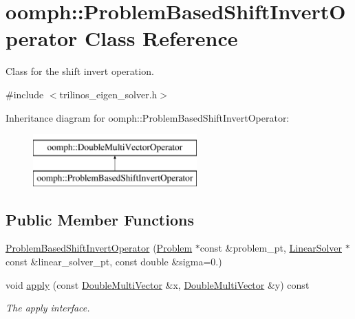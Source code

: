 \hypertarget{classoomph_1_1ProblemBasedShiftInvertOperator}{}\section{oomph\+:\+:Problem\+Based\+Shift\+Invert\+Operator Class Reference}
\label{classoomph_1_1ProblemBasedShiftInvertOperator}


Class for the shift invert operation.  




{\ttfamily \#include $<$trilinos\+\_\+eigen\+\_\+solver.\+h$>$}

Inheritance diagram for oomph\+:\+:Problem\+Based\+Shift\+Invert\+Operator\+:\begin{figure}[H]
\begin{center}
\leavevmode
\includegraphics[height=2.000000cm]{classoomph_1_1ProblemBasedShiftInvertOperator}
\end{center}
\end{figure}
\subsection*{Public Member Functions}
\begin{DoxyCompactItemize}
\item 
\hyperlink{classoomph_1_1ProblemBasedShiftInvertOperator_a2a25d70c81543acf3c97ae7fbe32648e}{Problem\+Based\+Shift\+Invert\+Operator} (\hyperlink{classoomph_1_1Problem}{Problem} $\ast$const \&problem\+\_\+pt, \hyperlink{classoomph_1_1LinearSolver}{Linear\+Solver} $\ast$const \&linear\+\_\+solver\+\_\+pt, const double \&sigma=0.)
\item 
void \hyperlink{classoomph_1_1ProblemBasedShiftInvertOperator_a1f209382d6023466da7e978ce16f1c09}{apply} (const \hyperlink{classoomph_1_1DoubleMultiVector}{Double\+Multi\+Vector} \&x, \hyperlink{classoomph_1_1DoubleMultiVector}{Double\+Multi\+Vector} \&y) const
\begin{DoxyCompactList}\small\item\em The apply interface. \end{DoxyCompactList}\end{DoxyCompactItemize}
